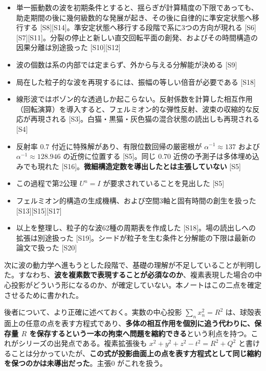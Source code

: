 \documentclass[
  10pt,
]{ltjsarticle}
\providecommand{\tightlist}{%
  \setlength{\itemsep}{0pt}\setlength{\parskip}{0pt}}
\begin{document}
\begin{itemize}
\tightlist
\item
  単一振動数の波を初期条件とすると、揺らぎが計算精度の下限であっても、助走期間の後に幾何級数的な発展が起き、その後に自律的に準安定状態へ移行する
  {[}S8{]}{[}S14{]}。準安定状態へ移行する段階で系に3つの方向が現れる
  {[}S6{]}{[}S7{]}{[}S11{]}。分裂の停止と新しい直交回転平面の創発、およびその時間構造の因果分離は別途扱った
  {[}S10{]}{[}S12{]}
\item
  波の個数は系の内部では定まらず、外から与える分解能が決める {[}S9{]}
\item
  局在した粒子的な波を再現するには、振幅の等しい倍音が必要である
  {[}S18{]}
\item
  線形波ではボゾン的な透過しか起こらない。反射係数を計算した相互作用（回転演算）を導入すると、フェルミオン的な弾性反射、波束の収縮的な反応が再現される
  {[}S3{]}。白猫・黒猫・灰色猫の混合状態の読出しも再現される {[}S4{]}
\item
  反射率 \(0.7\) 付近に特殊解があり、有限位数回帰の厳密根が
  \(\alpha^{-1}\approx137\) および \(\alpha^{-1}\approx128.946\)
  の近傍に位置する {[}S5{]}。同じ \(0.70\)
  近傍の予測子は多体埋め込みでも現れた
  {[}S16{]}。\textbf{微細構造定数を導出したとは主張していない} {[}S5{]}
\item
  この過程で第2公理 \(U^n = I\) が要求されていることを見出した {[}S5{]}
\item
  フェルミオン的構造の生成機構、および空間3軸と固有時間の創生を扱った
  {[}S13{]}{[}S15{]}{[}S17{]}
\item
  以上を整理し、粒子的な波62種の周期表を作成した
  {[}S18{]}。場の読出しへの拡張は別途扱った
  {[}S19{]}。シードが粒子を生む条件と分解能の下限は最新の論文で扱った
  {[}S20{]}
\end{itemize}

次に波の動力学へ進もうとした段階で、基礎の理解が不足していることが判明した。すなわち、\textbf{波を複素数で表現することが必須なのか}、複素表現した場合の中心投影がどういう形になるのか、が確定していない。本ノートはこの二点を確定させるために書かれた。

後者について、より正確に述べておく。実数の中心投影
\(\sum_n x_n^2 = R^2\)
は、球殻表面上の任意の点を表す方程式であり、\textbf{多体の相互作用を個別に追う代わりに、保存量
\(R\)
を保存するという一本の拘束へ問題を縮約できる}という利点を持つ。これがシリーズの出発点である。複素拡張後も
\(x^2+y^2+z^2-t^2 = R^2+Q^2\)
と書けることは分かっていたが、\textbf{この式が投影曲面上の点を表す方程式として同じ縮約を保つのかは未導出だった}。主張0
がこれを扱う。
\end{document}
